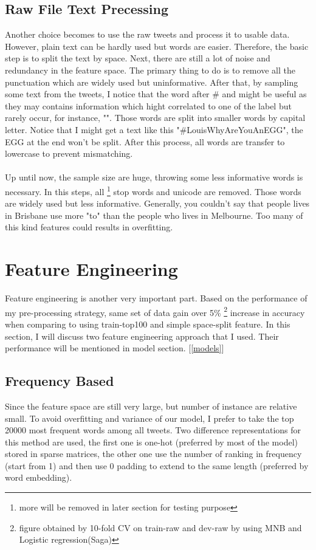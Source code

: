 \documentclass[11pt]{article}
\begin{document}
\subsection{Raw File Text Precessing}
Another choice becomes to use the raw tweets and process it to
usable data. However, plain text can be hardly used but words are easier. 
Therefore, the basic step is to split the text by space. Next, 
there are still a lot of noise and redundancy in the feature space.
The primary thing to do is to remove all the punctuation
which are widely used but uninformative.
After that, by sampling some text from the tweets, I notice that the 
word after
\# and \@ might be useful as they may contains information which
hight correlated to one of the label but rarely occur, 
for instance, "". Those words are split into smaller words by capital letter. 
Notice that I might get a text like this "\#LouisWhyAreYouAnEGG", the EGG at the
end won't be split. After this process, all words are transfer to lowercase to prevent mismatching.
\\
\\
Up until now, the sample size are huge, throwing some less 
informative words is necessary. In this steps, all
\footnote{more will be removed in later section for testing purpose} stop words
and unicode are removed.
Those words are widely used but less informative. Generally, you couldn't say that
people lives in Brisbane use more "to" than the people who lives in Melbourne. Too many 
of this kind features could results in overfitting.

\section{Feature Engineering}
\label{ext}
Feature engineering is another very important part.
Based on the performance of my pre-processing strategy, 
same set of data gain over 5\% 
\footnote{figure obtained by 10-fold CV on train-raw and dev-raw 
by using MNB and Logistic regression(Saga)}
increase in accuracy when comparing to using train-top100 and simple space-split feature.
In this section, I will discuss two feature engineering approach that
I used. Their performance will be mentioned in model section.
[\ref{models}]

\subsection{Frequency Based}
Since the feature space are still very large, but number of instance
are relative small. To avoid overfitting and variance of our model, 
I prefer to take the top 20000 most frequent words among all tweets. 
Two difference representations for this method are
used, the first one is one-hot (preferred by most of the model) stored in 
sparse matrices, the other one use the number of ranking in frequency 
(start from 1) and then use 
0 padding to extend to the same length (preferred by word embedding).
\end{document}
